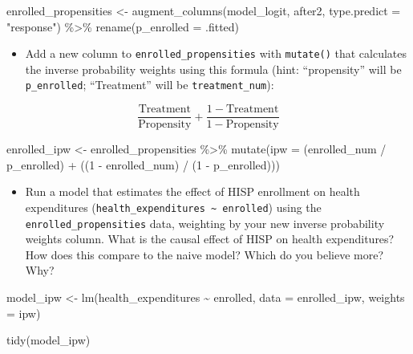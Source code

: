\documentclass[
  letterpaper,
  DIV=11,
  numbers=noendperiod]{scrartcl}
\newenvironment{Shaded}{\begin{snugshade}}{\end{snugshade}}
\newcommand{\AttributeTok}[1]{\textcolor[rgb]{0.40,0.45,0.13}{#1}}
\newcommand{\DecValTok}[1]{\textcolor[rgb]{0.68,0.00,0.00}{#1}}
\newcommand{\FunctionTok}[1]{\textcolor[rgb]{0.28,0.35,0.67}{#1}}
\newcommand{\NormalTok}[1]{\textcolor[rgb]{0.00,0.23,0.31}{#1}}
\newcommand{\OtherTok}[1]{\textcolor[rgb]{0.00,0.23,0.31}{#1}}
\newcommand{\SpecialCharTok}[1]{\textcolor[rgb]{0.37,0.37,0.37}{#1}}
\newcommand{\StringTok}[1]{\textcolor[rgb]{0.13,0.47,0.30}{#1}}
\providecommand{\tightlist}{%
  \setlength{\itemsep}{0pt}\setlength{\parskip}{0pt}}\usepackage{longtable,booktabs,array}
\begin{document}
\begin{Shaded}
\begin{Highlighting}[numbers=left,,]
\NormalTok{enrolled\_propensities }\OtherTok{\textless{}{-}} \FunctionTok{augment\_columns}\NormalTok{(model\_logit, after2, }
                                         \AttributeTok{type.predict =} \StringTok{"response"}\NormalTok{) }\SpecialCharTok{\%\textgreater{}\%} 
  \FunctionTok{rename}\NormalTok{(}\AttributeTok{p\_enrolled =}\NormalTok{ .fitted)}
\end{Highlighting}
\end{Shaded}

\begin{itemize}
\tightlist
\item
  Add a new column to \texttt{enrolled\_propensities} with
  \texttt{mutate()} that calculates the inverse probability weights
  using this formula (hint: ``propensity'' will be \texttt{p\_enrolled};
  ``Treatment'' will be \texttt{treatment\_num}):
\end{itemize}

\[
\frac{\text{Treatment}}{\text{Propensity}} + \frac{1 - \text{Treatment}}{1 - \text{Propensity}}
\]

\begin{Shaded}
\begin{Highlighting}[numbers=left,,]
\NormalTok{enrolled\_ipw }\OtherTok{\textless{}{-}}\NormalTok{ enrolled\_propensities }\SpecialCharTok{\%\textgreater{}\%}
  \FunctionTok{mutate}\NormalTok{(}\AttributeTok{ipw =}\NormalTok{ (enrolled\_num }\SpecialCharTok{/}\NormalTok{ p\_enrolled) }\SpecialCharTok{+} 
\NormalTok{           ((}\DecValTok{1} \SpecialCharTok{{-}}\NormalTok{ enrolled\_num) }\SpecialCharTok{/}\NormalTok{ (}\DecValTok{1} \SpecialCharTok{{-}}\NormalTok{ p\_enrolled)))}
\end{Highlighting}
\end{Shaded}

\begin{itemize}
\tightlist
\item
  Run a model that estimates the effect of HISP enrollment on health
  expenditures
  (\texttt{health\_expenditures\ \textasciitilde{}\ enrolled}) using the
  \texttt{enrolled\_propensities} data, weighting by your new inverse
  probability weights column. What is the causal effect of HISP on
  health expenditures? How does this compare to the naive model? Which
  do you believe more? Why?
\end{itemize}

\begin{Shaded}
\begin{Highlighting}[numbers=left,,]
\NormalTok{model\_ipw }\OtherTok{\textless{}{-}} \FunctionTok{lm}\NormalTok{(health\_expenditures }\SpecialCharTok{\textasciitilde{}}\NormalTok{ enrolled,}
                \AttributeTok{data =}\NormalTok{ enrolled\_ipw,}
                \AttributeTok{weights =}\NormalTok{ ipw)}

\FunctionTok{tidy}\NormalTok{(model\_ipw)}
\end{Highlighting}
\end{Shaded}
\end{document}
